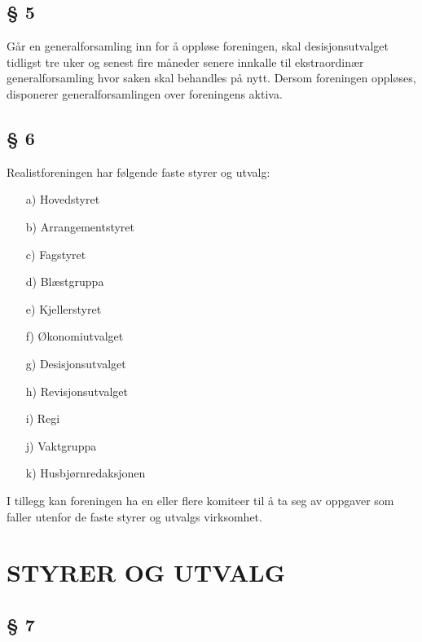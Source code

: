 \subsection*{§ 5}

Går en generalforsamling inn for å oppløse foreningen, skal
desisjonsutvalget tidligst tre uker og senest fire måneder senere
innkalle til ekstraordinær generalforsamling hvor saken skal behandles
på nytt. Dersom foreningen oppløses, disponerer generalforsamlingen
over foreningens aktiva.


\subsection*{§ 6}

Realistforeningen har følgende faste styrer og utvalg: 

\begin{itemize}
\item[a)] Hovedstyret 

\item[b)] Arrangementstyret 

\item[c)] Fagstyret

\item[d)] Blæstgruppa

\item[e)] Kjellerstyret

\item[f)] Økonomiutvalget 

\item[g)] Desisjonsutvalget 

\item[h)] Revisjonsutvalget 

\item[i)] Regi 

\item[j)] Vaktgruppa 

\item[k)] Husbjørnredaksjonen
\end{itemize}

I tillegg kan foreningen ha en eller flere komiteer til å ta seg av
oppgaver som faller utenfor de faste styrer og utvalgs virksomhet.



\section*{STYRER OG UTVALG}


\subsection*{§ 7}

